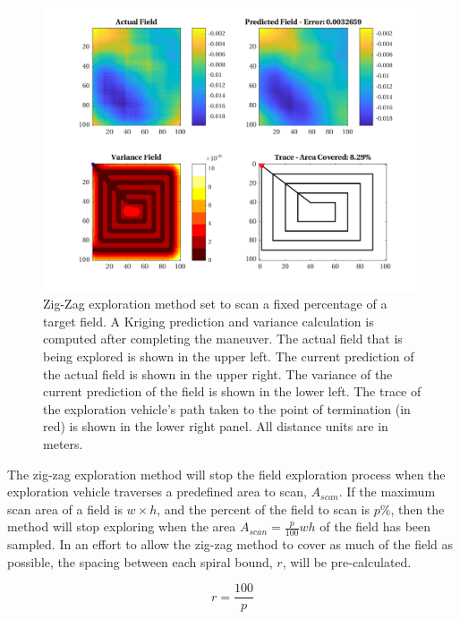 \begin{figure}[hbt!]
    \centering
    \includegraphics[width=0.9\linewidth]{figures/hbresults/zz_10p_100x100_sf_25_seed_2.png}
    \captionsetup{skip=0.20\baselineskip}
    \ssp
    \caption{Zig-Zag exploration method set to scan a fixed percentage of a target field. A Kriging prediction and variance calculation is computed after completing the maneuver. The actual field that is being explored is shown in the upper left. The current prediction of the actual field is shown in the upper right. The variance of the current prediction of the field is shown in the lower left. The trace of the exploration vehicle's path taken to the point of termination (in red) is shown in the lower right panel. All distance units are in meters.}
    \label{fig:zigzag4}
\end{figure}
\clearpage

The zig-zag exploration method will stop the field exploration process when the exploration vehicle traverses a predefined area to scan, $A_{scan}$. If the maximum scan area of a field is $w \times h$, and the percent of the field to scan is $p\%$, then the method will stop exploring when the area $A_{scan} = \frac{p}{100}wh$ of the field has been sampled. In an effort to allow the zig-zag method to cover as much of the field as possible, the spacing between each spiral bound, $r$, will be pre-calculated.

\begin{equation}
    r = \frac{100}{p}
\end{equation}

